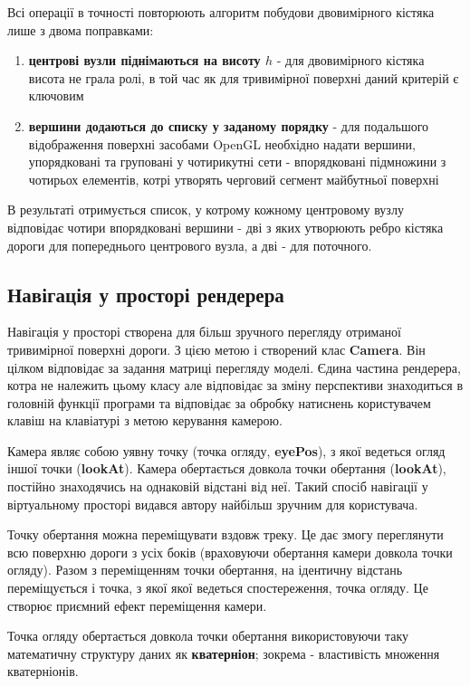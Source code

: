 \documentclass[simple,a4paper,14pt,ukrainian,utf8]{eskdtext}
\begin{document}
		Всі операції в точності повторюють алгоритм побудови двовимірного кістяка лише з двома поправками:
		
		\begin{enumerate}
			\item \textbf{центрові вузли піднімаються на висоту $h$} - для двовимірного кістяка висота не грала ролі, в той час як для тривимірної поверхні даний критерій є ключовим
			\item \textbf{вершини додаються до списку у заданому порядку} - для подальшого відображення поверхні засобами OpenGL необхідно надати вершини, упорядковані та груповані у чотирикутні сети - впорядковані підмножини з чотирьох елементів, котрі утворять черговий сегмент майбутньої поверхні
		\end{enumerate}
		
		В результаті отримується список, у котрому кожному центровому вузлу відповідає чотири впорядковані вершини - дві з яких утворюють ребро кістяка дороги для попереднього центрового вузла, а дві - для поточного.
	
	\subsection{Навігація у просторі рендерера}
	
		Навігація у просторі створена для більш зручного перегляду отриманої тривимірної поверхні дороги. З цією метою і створений клас \textbf{Camera}. Він цілком відповідає за задання матриці перегляду моделі. Єдина частина рендерера, котра не належить цьому класу але відповідає за зміну перспективи знаходиться в головній функції програми та відповідає за обробку натиснень користувачем клавіш на клавіатурі з метою керування камерою.
		
		Камера являє собою уявну точку (точка огляду, \textbf{eyePos}), з якої ведеться огляд іншої точки (\textbf{lookAt}). Камера обертається довкола точки обертання (\textbf{lookAt}), постійно знаходячись на однаковій відстані від неї. Такий спосіб навігації у віртуальному просторі видався автору найбільш зручним для користувача.
		
		Точку обертання можна переміщувати вздовж треку. Це дає змогу переглянути всю поверхню дороги з усіх боків (враховуючи обертання камери довкола точки огляду). Разом з переміщенням точки обертання, на ідентичну відстань переміщується і точка, з якої якої ведеться спостереження, точка огляду. Це створює приємний ефект переміщення камери.
		
		Точка огляду обертається довкола точки обертання використовуючи таку математичну структуру даних як \textbf{кватерніон}; зокрема - властивість множення кватерніонів.
       
\end{document}

